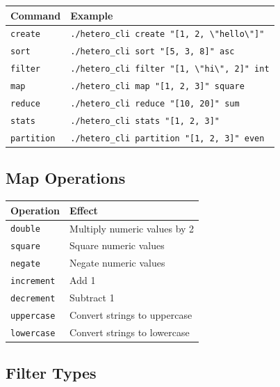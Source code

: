 \documentclass[11pt,a4paper]{article}
\begin{document}
\begin{center}
\begin{tabular}{|l|p{10cm}|}
\hline
\textbf{Command} & \textbf{Example} \\
\hline
\texttt{create} & \texttt{./hetero\_cli create "[1, 2, \textbackslash"hello\textbackslash"]"} \\
\texttt{sort} & \texttt{./hetero\_cli sort "[5, 3, 8]" asc} \\
\texttt{filter} & \texttt{./hetero\_cli filter "[1, \textbackslash"hi\textbackslash", 2]" int} \\
\texttt{map} & \texttt{./hetero\_cli map "[1, 2, 3]" square} \\
\texttt{reduce} & \texttt{./hetero\_cli reduce "[10, 20]" sum} \\
\texttt{stats} & \texttt{./hetero\_cli stats "[1, 2, 3]"} \\
\texttt{partition} & \texttt{./hetero\_cli partition "[1, 2, 3]" even} \\
\hline
\end{tabular}
\end{center}

\subsection{Map Operations}

\begin{center}
\begin{tabular}{|l|l|}
\hline
\textbf{Operation} & \textbf{Effect} \\
\hline
\texttt{double} & Multiply numeric values by 2 \\
\texttt{square} & Square numeric values \\
\texttt{negate} & Negate numeric values \\
\texttt{increment} & Add 1 \\
\texttt{decrement} & Subtract 1 \\
\texttt{uppercase} & Convert strings to uppercase \\
\texttt{lowercase} & Convert strings to lowercase \\
\hline
\end{tabular}
\end{center}

\subsection{Filter Types}
\end{document}
